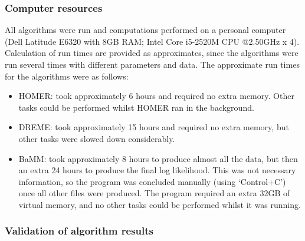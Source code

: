 \documentclass[12pt]{article}
\begin{document}
\subsubsection{Computer resources}

All algorithms were run and computations performed on a personal computer (Dell Latitude E6320 with 8GB RAM; Intel Core i5-2520M CPU @2.50GHz x 4). Calculation of run times are provided as approximates, since the algorithms were run several times with different parameters and data. The approximate run times for the algorithms were as follows:
\begin{itemize}
\item HOMER: took approximately 6 hours and required no extra memory. Other tasks could be performed whilst HOMER ran in the background.
\item DREME: took approximately 15 hours and required no extra memory, but other tasks were slowed down considerably.
\item BaMM: took approximately 8 hours to produce almost all the data, but then an extra 24 hours to produce the final log likelihood. This was not necessary information, so the program was concluded manually (using `Control+C') once all other files were produced. The program required an extra 32GB of virtual memory, and no other tasks could be performed whilst it was running.
\end{itemize}


\subsubsection{Validation of algorithm results}
\end{document}
